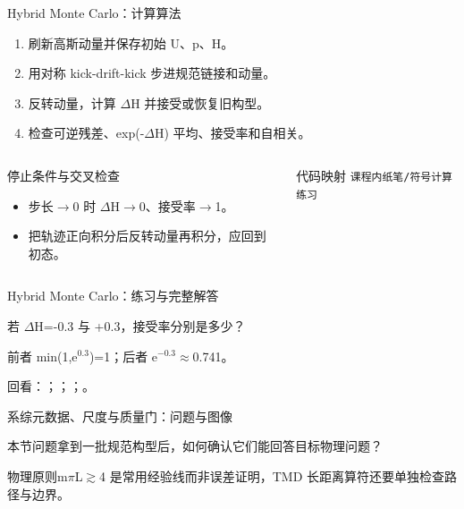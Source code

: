 \begin{frame}[t]{Hybrid Monte Carlo：计算算法}
\footnotesize
{}\begin{enumerate}
\item 刷新高斯动量并保存初始 U、p、H。
\item 用对称 kick-drift-kick 步进规范链接和动量。
\item 反转动量，计算 \ensuremath{\Delta}H 并接受或恢复旧构型。
\item 检查可逆残差、exp(-\ensuremath{\Delta}H) 平均、接受率和自相关。
\end{enumerate}\begin{columns}[T,onlytextwidth]
\begin{block}{停止条件与交叉检查}\scriptsize\begin{itemize}
\item[\CheckMark] 步长\ensuremath{\rightarrow}0 时 \ensuremath{\Delta}H\ensuremath{\rightarrow}0、接受率\ensuremath{\rightarrow}1。
\item[\CheckMark] 把轨迹正向积分后反转动量再积分，应回到初态。
\end{itemize}\end{block}
\begin{block}{代码映射}
\scriptsize \texttt{课程内纸笔/\allowbreak{}符号计算练习}
\end{block}\end{columns}\end{frame}

\begin{frame}[t]{Hybrid Monte Carlo：练习与完整解答}
\footnotesize
\begin{block}{}若 \ensuremath{\Delta}H=-0.3 与 +0.3，接受率分别是多少？\end{block}
\begin{exampleblock}{}前者 min(1,e\ensuremath{^{0.3}})=1；后者 e\ensuremath{^{-0.3}}\ensuremath{\approx}0.741。\end{exampleblock}
\vfill
\scriptsize 回看：；；；。
\end{frame}

\begin{frame}[t]{系综元数据、尺度与质量门：问题与图像}
\footnotesize
\begin{block}{本节问题}拿到一批规范构型后，如何确认它们能回答目标物理问题？\end{block}
\begin{block}{物理原则}\quad m\ensuremath{\pi}L\ensuremath{\gtrsim}4 是常用经验线而非误差证明，TMD 长距离算符还要单独检查路径与边界。\end{block}
\end{frame}

